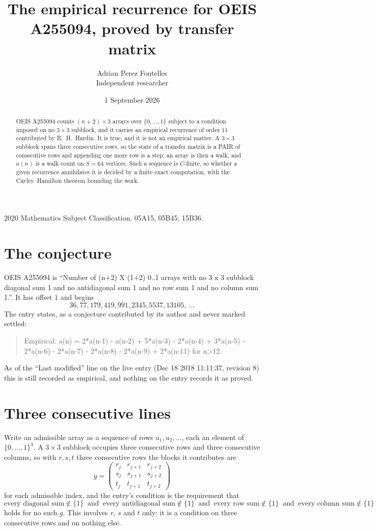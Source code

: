 \documentclass[11pt,a4paper]{article}
\title{The empirical recurrence for OEIS A255094, proved by transfer matrix}
\author{Adrian Perez Fontelles\\ \small Independent researcher}
\date{1 September 2026}
\theoremstyle{plain}
\theoremstyle{definition}
\begin{document}
\maketitle

\begin{abstract}
OEIS A255094 counts $(n+2)\times3$ arrays over $\{0,\dots,1\}$ subject to a condition imposed on
no $3\times3$ subblock, and it carries an empirical recurrence of order $11$
contributed by R.~H.~Hardin. It is true, and it is not an empirical matter. A $3\times3$
subblock spans three consecutive rows, so the state of a transfer matrix is a PAIR of
consecutive rows and appending one more row is a step; an array is then a walk, and
$a(n)$ is a walk count on $S=64$ vertices. Such a sequence is $C$-finite, so whether a given
recurrence annihilates it is decided by a finite exact computation, with the Cayley--Hamilton
theorem bounding the work.
\end{abstract}

\noindent\small 2020 Mathematics Subject Classification. 05A15, 05B45, 15B36.\normalsize

\section{The conjecture}

OEIS A255094 is ``Number of (n+2) X (1+2) 0..1 arrays with no 3 x 3 subblock diagonal sum 1 and no antidiagonal sum 1 and no row sum 1 and no column sum 1.''. It has offset $1$ and begins
\[
36, 77, 179, 419, 991, 2345, 5537, 13105,\ \dots
\]
The entry states, as a conjecture contributed by its author and never marked settled:
\begin{quote}
Empirical: a(n) = 2*a(n-1) - a(n-2) + 5*a(n-3) - 2*a(n-4) + 3*a(n-5) - 2*a(n-6) - 2*a(n-7) - 2*a(n-8) - 2*a(n-9) + 2*a(n-11) for n>12.
\end{quote}
As of the ``Last modified'' line on the live entry (Dec 18 2018 11:11:37, revision 8) this is still
recorded as empirical, and nothing on the entry records it as proved.

\section{Three consecutive lines}

Write an admissible array as a sequence of rows $u_1,u_2,\dots$, each an element of
$\{0,\dots,1\}^{3}$. A $3\times3$ subblock occupies three consecutive rows and
three consecutive columns, so with $r,s,t$ three consecutive rows the blocks it
contributes are
\[
g=\begin{pmatrix}r_j&r_{j+1}&r_{j+2}\\ s_j&s_{j+1}&s_{j+2}\\ t_j&t_{j+1}&t_{j+2}\end{pmatrix}
\]
for each admissible index, and the entry's condition is the requirement that
\[
\text{every diagonal sum} \notin \{1\}\ \text{ and }\ \text{every antidiagonal sum} \notin \{1\}\ \text{ and }\ \text{every row sum} \notin \{1\}\ \text{ and }\ \text{every column sum} \notin \{1\}
\]
holds for no such $g$. This involves $r$, $s$ and $t$ only: it is a condition on
three consecutive rows and on nothing else.
\end{document}
